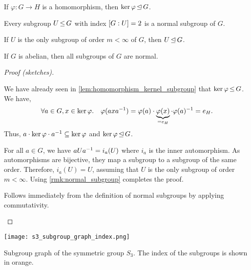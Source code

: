\begin{lem}
\leavevmode\begin{lemlist}
    \item If $\varphi : G \to H$ is a homomorphism, then $\ker{\varphi} \operatorname*{\trianglelefteq} G$.
    \item Every subgroup $U \operatorname*{\leq} G$ with index $[G:U] = 2$ is a normal subgroup of $G$.
    \item\label{lem:normal_subgroup_c} If $U$ is the only subgroup of order $m < \infty$ of $G$, then $U \operatorname*{\trianglelefteq} G$.
    \item If $G$ is abelian, then all subgroups of $G$ are normal.
\end{lemlist}
\end{lem} \begin{proof}[Proof (sketches)]
\leavevmode\begin{lemlist}
    \item We have already seen in \cref{lem:homomorphism_kernel_subgroup} that $\ker{\varphi} \operatorname*{\leq} G$. We have, \begin{align*}
        \forall a \in G, x \in \ker{\varphi}.\quad \varphi(a x a^{-1}) = \varphi(a) \cdot \underbrace{\varphi(x)}_{= e_H} \cdot \varphi(a)^{-1} = e_H.
    \end{align*} Thus, $a \cdot \ker{\varphi} \cdot a^{-1} \subseteq \ker{\varphi}$ and $\ker{\varphi} \operatorname*{\trianglelefteq} G$.
    
    \addtocounter{lemlisti}{1}\item For all $a \in G$, we have $a U a^{-1} = i_a(U)$ where $i_a$ is the inner automorphism. As automorphisms are bijective, they map a subgroup to a subgroup of the same order. Therefore, ${i_a(U) = U}$, assuming that $U$ is the only subgroup of order $m < \infty$. Using \cref{rmk:normal_subgroup} completes the proof.
    
    \item Follows immediately from the definition of normal subgroups by applying commutativity. \qedhere
\end{lemlist}
\end{proof}

\begin{marginfigure}
    \texttt{[image: s3\_subgroup\_graph\_index.png]}
    \caption{Subgroup graph of the symmetric group $S_3$. The index of the subgroups is shown in orange.}
\end{marginfigure}


